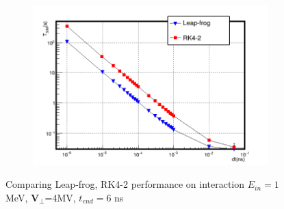 \documentclass[a4paper,oneside,12pt]{report}
\numberwithin{equation}{chapter}
\begin{document}
{\begin{figure}[H]
    \begin{subfigure}{0.9\textwidth}
        \centering
        \includegraphics[width=\linewidth]{./figures/analiz/90staticE_lf_rk2_dt-Tsim.png}
    \end{subfigure}
    \caption{Comparing Leap-frog, RK4-2 performance on \eE interaction $E_{in}=1$MeV, $\textbf{V}_{\perp}$=4MV, $t_{end}=6$ ns}
    \label{fig:lf_rk2_perp_stat_E_comparison}
\end{figure} \fi
\begin{figure}[H]
    \centering
    \vspace{1pt}

\end{figure}}
\end{document}
